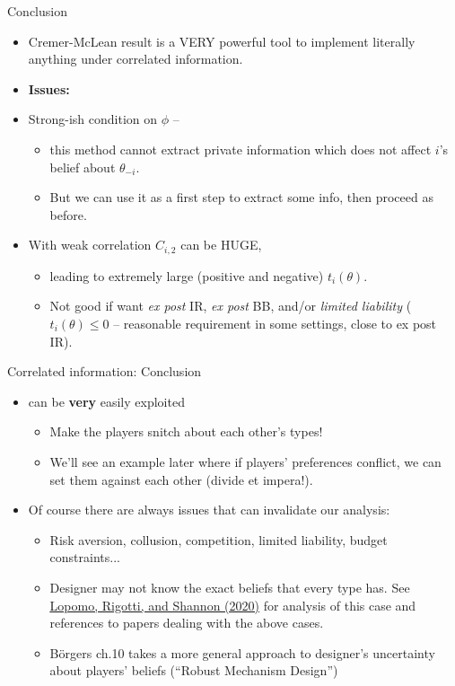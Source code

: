 \documentclass[english,10pt
,aspectratio=169
]{beamer}
\begin{document}
\begin{frame}{Conclusion}
\begin{itemize}
	\item Cremer-McLean result is a VERY powerful tool to implement literally anything under correlated information.
	\item \textbf{Issues:}
	\item Strong-ish condition on $\phi$ --
	\begin{itemize}
		\item this method cannot extract private information which does not affect $i$'s belief about $\theta_{-i}$.
		\item But we can use it as a first step to extract some info, then proceed as before.
	\end{itemize}
	\item With weak correlation $C_{i,2}$ can be HUGE,
	\begin{itemize}
		\item leading to extremely large (positive and negative) $t_i(\theta)$.
		\item Not good if want \emph{ex post} IR, \emph{ex post} BB, and/or \emph{limited liability} ($t_i(\theta)\leq 0$ -- reasonable requirement in some settings, close to ex post IR).
	\end{itemize}
\end{itemize}
\end{frame}





\begin{frame}{Correlated information: Conclusion}
\begin{itemize}
	\item {} can be \alert{\textbf{very} easily exploited}
	\begin{itemize}
		\item Make the players snitch about each other's types! %
		\item We'll see an example later where if players' preferences conflict, we can set them against each other (divide et impera!).
	\end{itemize}
	\item Of course there are always issues that can invalidate our analysis:
	\begin{itemize}
		\item Risk aversion, collusion, competition, limited liability, budget constraints...
		\item Designer may not know the exact beliefs that every type has. See \href{https://doi.org/10.1016/j.jet.2020.105088}{\uline{Lopomo, Rigotti, and Shannon (2020)}} for analysis of this case and references to papers dealing with the above cases.
		\item B{\"o}rgers ch.10 takes a more general approach to designer's uncertainty about players' beliefs (``Robust Mechanism Design'')
	\end{itemize}
\end{itemize}
\end{frame}
\end{document}
